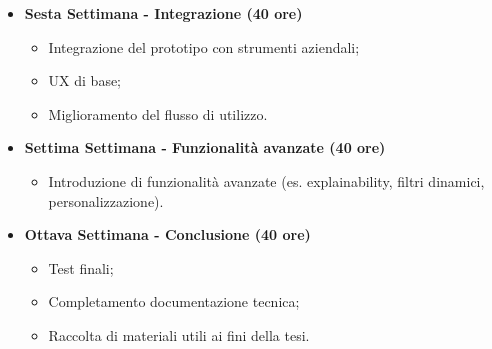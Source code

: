 {\begin{itemize}
\begin{itemize}
            \item Ottimizzazione dei prompt e output LLM;
            \item Test del sistema.
        \end{itemize}
        \item \textbf{Sesta Settimana - Integrazione (40 ore)} 
        \begin{itemize}
            \item Integrazione del prototipo con strumenti aziendali;
            \item UX di base;
            \item Miglioramento del flusso di utilizzo.
        \end{itemize}
        \item \textbf{Settima Settimana - Funzionalità avanzate (40 ore)} 
        \begin{itemize}
            \item Introduzione di funzionalità avanzate (es. explainability, filtri dinamici, personalizzazione).
        \end{itemize}
        \item \textbf{Ottava Settimana - Conclusione (40 ore)} 
        \begin{itemize}
            \item Test finali;
            \item Completamento documentazione tecnica;
            \item Raccolta di materiali utili ai fini della tesi.
        \end{itemize}
    \end{itemize}
}

\newcommand{\totaleOre}{320}

\newcommand{\obiettiviObbligatori}{
	 \item \underline{\textit{O01}}: Acquisizione di competenze pratiche su Oribea/DialogSphere;
	 \item \underline{\textit{O02}}: Connessione a database e gestione dati aziendali o pubblici;
	 \item \underline{\textit{O03}}: Implementazione di un Task AI per l’analisi di bilancio con LLM;
	 \item \underline{\textit{O04}}: Generazione automatica di report con output coerente, chiaro e adattabile;
	 \item \underline{\textit{O05}}: Testing e documentazione completa del prototipo.
	 
}


